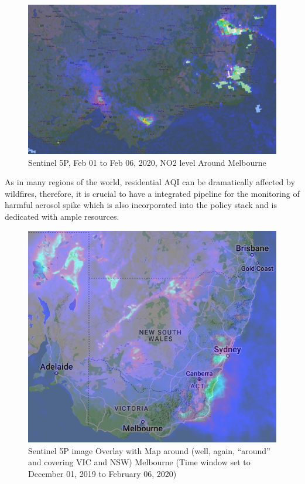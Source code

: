 \documentclass[
  letterpaper,
  DIV=11,
  numbers=noendperiod]{scrreprt}
\begin{document}
\begin{figure}

{\centering \includegraphics[width=6.92708in,height=\textheight]{images/wk4/senti5p_no2_melb.png}

}

\caption{Sentinel 5P, Feb 01 to Feb 06, 2020, NO2 level Around
Melbourne}

\end{figure}

As in many regions of the world, residential AQI can be dramatically
affected by wildfires, therefore, it is crucial to have a integrated
pipeline for the monitoring of harmful aerosol spike which is also
incorporated into the policy stack and is dedicated with ample
resources.

\begin{figure}

{\centering \includegraphics[width=6.92708in,height=\textheight]{images/wk4/senti5p_melb_2019_12_01_to_2020_02_06.png}

}

\caption{Sentinel 5P image Overlay with Map around (well, again,
``around'' and covering VIC and NSW) Melbourne (Time window set to
December 01, 2019 to February 06, 2020)}

\end{figure}
\end{document}
